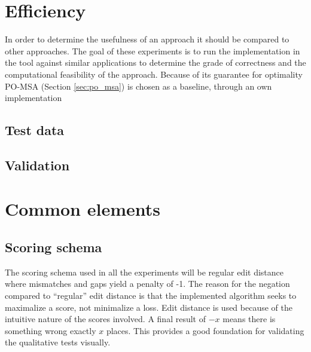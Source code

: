 \documentclass[thesis.tex]{subfiles}
\begin{document}
\section{Efficiency}
In order to determine the usefulness of an approach it should be compared to other approaches. The goal of these experiments is to run the implementation in the tool against similar applications to determine the grade of correctness and the computational feasibility of the approach. Because of its guarantee for optimality PO-MSA (Section \ref{sec:po_msa}) is chosen as a baseline, through an own implementation
\subsection{Test data}
\subsection{Validation}
\section{Common elements}
\subsection{Scoring schema}
The scoring schema used in all the experiments will be regular edit distance where mismatches and gaps yield a penalty of -1. The reason for the negation compared to ``regular'' edit distance is that the implemented algorithm seeks to maximalize a score, not minimalize a loss. Edit distance is used because of the intuitive nature of the scores involved. A final result of $-x$ means there is something wrong exactly $x$ places. This provides a good foundation for validating the qualitative tests visually.
\end{document}
